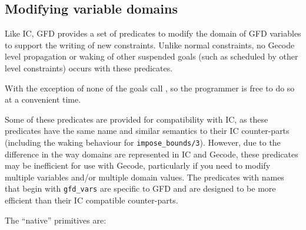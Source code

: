 \subsection{Modifying variable domains}

Like IC, GFD provides a set of predicates to modify the domain of GFD 
variables to support the writing of new constraints. Unlike normal constraints,
no Gecode level propagation or waking of other suspended goals (such as 
scheduled by other {\eclipse} level constraints) occurs with these predicates.

With the exception of
 none of
the goals call , so
the programmer is free to do so at a convenient time.

Some of these predicates are provided for compatibility with IC, as these 
predicates have the same name and similar semantics to their IC counter-parts
(including the waking behaviour for {\tt impose_bounds/3}).
However, due to the difference in the way domains are represented in IC and
Gecode, these predicates may be inefficient for use with Gecode, particularly
if you need to modify multiple variables and/or multiple domain values. 
The predicates with names that begin with {\tt gfd_vars} are specific
to GFD and are designed to be more efficient than their IC compatible 
counter-parts.

The ``native'' primitives are:

